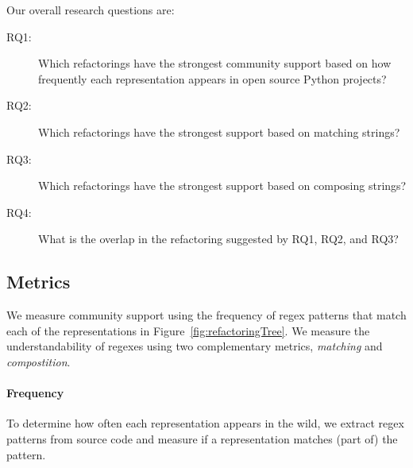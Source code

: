 Our overall research questions are:
\begin{description}
\item[RQ1:] Which refactorings have the strongest community support based on how frequently each representation appears in open source Python projects?
\item[RQ2:] Which refactorings have the strongest support based on matching strings?
\item[RQ3:] Which refactorings have the strongest support based on composing strings? 
\item[RQ4:] What is the overlap in the refactoring suggested by RQ1, RQ2, and RQ3? 
\end{description}



%
%
%
%
%
%
%

\subsection{Metrics}
\label{sec:metric}
We measure community support using the frequency of regex patterns that match each of the representations in Figure~\ref{fig:refactoringTree}. We measure the understandability of regexes using two complementary metrics, \emph{matching} and \emph{compostition}. 

\paragraph{Frequency}
To determine how often each representation appears in the wild, we extract regex patterns from source code and measure if a representation matches (part of) the pattern.

